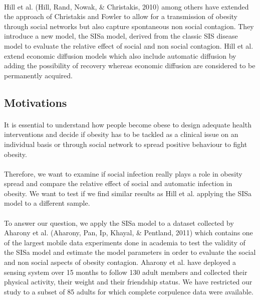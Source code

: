 \documentclass[11pt]{article}
\begin{document}
\paragraph{}
Hill et al. (Hill, Rand, Nowak, \& Christakis, 2010) among others have extended the approach of Christakis and Fowler to allow for a transmission of obesity through social networks but also capture spontaneous non social contagion. They introduce a new model, the SISa model, derived from the classic SIS disease model to evaluate the relative effect of social and non social contagion. Hill et al. extend economic diffusion models which also include automatic diffusion by adding the possibility of recovery whereas economic diffusion are considered to be permanently acquired.

\subsection{Motivations}
\paragraph{}
It is essential to understand how people become obese to design adequate health interventions and decide if obesity has to be tackled as a clinical issue on an individual basis or through social network to spread positive behaviour to fight obesity.

\paragraph{}
Therefore, we want to examine if social infection really plays a role in obesity spread and compare the  relative effect of social and automatic infection in obesity. We want to test if we find similar results as Hill et al. applying the SISa model to a different sample.

\paragraph{}
To answer our question, we apply the SISa model to a dataset collected by Aharony et al. (Aharony, Pan, Ip, Khayal, \& Pentland, 2011) which contains one of the largest mobile data experiments done in academia to test the validity of the SISa model and estimate the model parameters in order to evaluate the social and non social aspects of obesity contagion. Aharony et al. have deployed a sensing system over 15 months to follow 130 adult members and collected their physical activity, their weight and their friendship status. We have restricted our study to a subset of 85 adults for which complete corpulence data were available.
\end{document}
